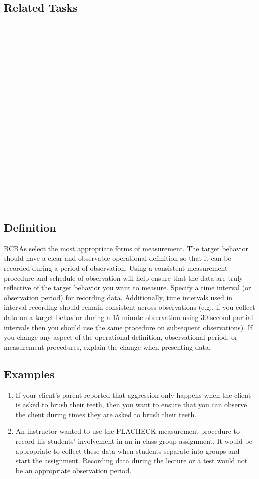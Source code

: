 \subsection{Related Tasks}
\fouraOne{}\\
\fouraTwo{}\\
\fouraThree{}\\
\fouraFour{}\\
\fouraNine{}\\ 
\fouraTen{}\\
\fourdFive{}\\
\fourhTwo{}\\
\fourhThree{}\\
\fourhFour{}\\
\fourhFive{}\\
\fouriOne{}\\
\fouriFive{}\\
\fourkSeven{}\\
\fourFKThirtyThree{}\\
\fourFKFourtyOne{}\\
\fourFKFourtySeven{}\\
\fourFKFourtyEight{}\\
%
%
%
%
%
\section{\fourhTwo{}}
\subsection{Definition}
BCBAs select the most appropriate forms of measurement. The target behavior should have a clear and observable operational definition so that it can be recorded during a period of observation. Using a consistent measurement procedure and schedule of observation will help ensure that the data are truly reflective of the target behavior you want to measure. Specify a time interval (or observation period) for recording data. Additionally, time intervals used in interval recording should remain consistent across observations (e.g., if you collect data on a target behavior during a 15 minute observation using 30-second partial intervals then you should use the same procedure on subsequent observations).  If you change any aspect of the operational definition, observational period, or measurement procedures, explain the change when presenting data.
%
\subsection{Examples}
\begin{enumerate}
\item If your client's parent reported that aggression only happens when the client is asked to brush their teeth, then you want to ensure that you can observe the client during times they are asked to brush their teeth.
\item An instructor wanted to use the PLACHECK measurement procedure to record his students' involvement in an in-class group assignment.  It would be appropriate to collect these data when students separate into groups and start the assignment.  Recording data during the lecture or a test would not be an appropriate observation period.
%
\end{enumerate}
%
